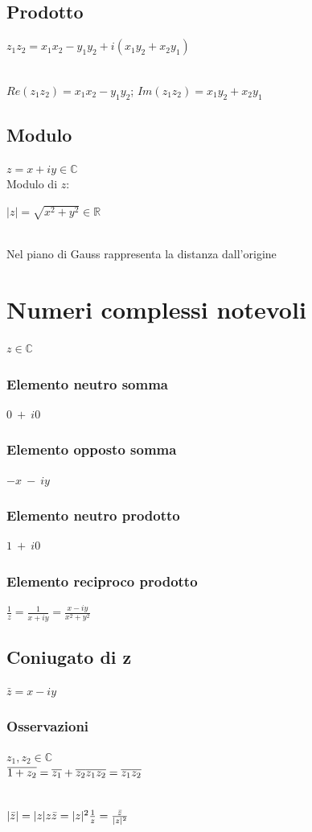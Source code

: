 \subsection{Prodotto}
\begin{Large}
$z_1z_2 = x_1x_2-y_1y_2+i(x_1y_2+ x_2y_1)$ 
\end{Large}\\
$Re(z_1z_2) = x_1x_2-y_1y_2$;   $Im(z_1z_2) = x_1y_2 + x_2y_1$
\subsection{Modulo}
$z = x+iy \in \mathbb{C}$\\
Modulo di $z$:\\
\begin{Large}
$|z| = \sqrt{x^2+y^2} \in \mathbb{R}$
\end{Large}\\
Nel piano di Gauss rappresenta la distanza dall'origine

\section{Numeri complessi notevoli}
$z \in \mathbb{C}$
\subsubsection{Elemento neutro somma}
$0\ +\ i0$
\subsubsection{Elemento opposto somma}
$-x\ -\ iy$
\subsubsection{Elemento neutro prodotto}
$1\ +\ i0$
\subsubsection{Elemento reciproco prodotto}
\begin{Large}
$\frac{1}{z}=\frac{1}{x+iy}=\frac{x-iy}{x^2+y^2}$
\end{Large}

\subsection{Coniugato di z}
$\bar{z} = x-iy$
\subsubsection{Osservazioni}
$z_1,z_2 \in \mathbb{C}$\\
$\overline{1+z_2} = \overline{z_1}+\overline{z_2}\\
\overline{z_1z_2} = \overline{z_1}\overline{z_2}$\\
\\
\begin{Large}
$|\bar{z}| = |z|\\
z\bar{z}=|z|^2\\
\frac{1}{z} = \frac{\bar{z}}{|z|^2}$
\end{Large}

